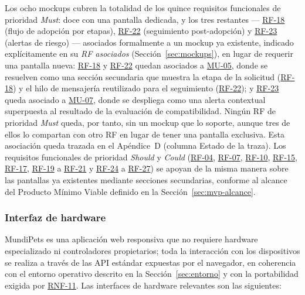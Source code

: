 \documentclass[journal,onecolumn]{IEEEtran}
\begin{document}
	Los ocho mockups cubren la totalidad de los quince requisitos funcionales
	de prioridad \emph{Must}: doce con una pantalla dedicada, y los tres
	restantes --- \hyperref[tab:RF-18]{RF-18} (flujo de adopción por etapas), \hyperref[tab:RF-22]{RF-22} (seguimiento
	post-adopción) y \hyperref[tab:RF-23]{RF-23} (alertas de riesgo) --- asociados formalmente a un
	mockup ya existente, indicado explícitamente en su \emph{RF asociados}
	(Sección~\ref{sec:mockups}), en lugar de requerir una pantalla nueva:
	\hyperref[tab:RF-18]{RF-18} y \hyperref[tab:RF-22]{RF-22} quedan asociados a \hyperref[fig:mu05]{MU-05}, donde se resuelven como una
	sección secundaria que muestra la etapa de la solicitud (\hyperref[tab:RF-18]{RF-18}) y el hilo
	de mensajería reutilizado para el seguimiento (\hyperref[tab:RF-22]{RF-22}); y \hyperref[tab:RF-23]{RF-23} queda
	asociado a \hyperref[fig:mu07]{MU-07}, donde se despliega como una alerta contextual
	superpuesta al resultado de la evaluación de compatibilidad. Ningún RF de
	prioridad \emph{Must} queda, por tanto, sin un mockup que lo soporte,
	aunque tres de ellos lo compartan con otro RF en lugar de tener una
	pantalla exclusiva. Esta asociación queda trazada en el Apéndice~D
	(columna Estado de la traza). Los requisitos funcionales de prioridad
	\emph{Should} y \emph{Could} (\hyperref[tab:RF-04]{RF-04}, \hyperref[tab:RF-07]{RF-07}, \hyperref[tab:RF-10]{RF-10}, \hyperref[tab:RF-15]{RF-15}, \hyperref[tab:RF-17]{RF-17}, \hyperref[tab:RF-19]{RF-19} a
	\hyperref[tab:RF-21]{RF-21} y \hyperref[tab:RF-24]{RF-24} a \hyperref[tab:RF-27]{RF-27}) se apoyan de la misma manera sobre las pantallas ya
	existentes mediante secciones secundarias, conforme al alcance del
	Producto Mínimo Viable definido en la Sección~\ref{sec:mvp-alcance}.
	
	\subsubsection{Interfaz de hardware}
	\label{sec:interfaz-hardware}
	
	MundiPets es una aplicación web responsiva que no requiere hardware
	especializado ni controladores propietarios; toda la interacción con los
	dispositivos se realiza a través de las API estándar expuestas por el
	navegador, en coherencia con el entorno operativo descrito en la
	Sección~\ref{sec:entorno} y con la portabilidad exigida por \hyperref[tab:RNF-11]{RNF-11}. Las
	interfaces de hardware relevantes son las siguientes:
	
\end{document}
